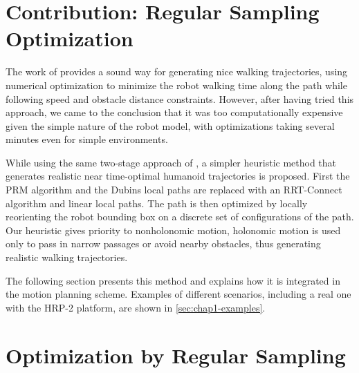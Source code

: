 \section{Contribution: Regular Sampling Optimization}
\label{sec:chap1-contribution}

The work of \cite{moul10} provides a sound way for generating nice
walking trajectories, using numerical optimization to minimize the
robot walking time along the path while following speed and obstacle
distance constraints. However, after having tried this approach, we
came to the conclusion that it was too computationally expensive given
the simple nature of the robot model, with optimizations taking
several minutes even for simple environments.

While using the same two-stage approach of \cite{yosh08}, a simpler
heuristic method that generates realistic near time-optimal humanoid
trajectories is proposed. First the PRM algorithm and the Dubins local
paths are replaced with an RRT-Connect algorithm and linear local
paths. The path is then optimized by locally reorienting the robot
bounding box on a discrete set of configurations of the path. Our
heuristic gives priority to nonholonomic motion, holonomic motion is
used only to pass in narrow passages or avoid nearby obstacles, thus
generating realistic walking trajectories.

The following section presents this method and explains how it is
integrated in the motion planning scheme. Examples of different
scenarios, including a real one with the HRP-2 platform, are shown in
\autoref{sec:chap1-examples}.

\section{Optimization by Regular Sampling}
\label{sec:chap1-regular-sampling-optim}

